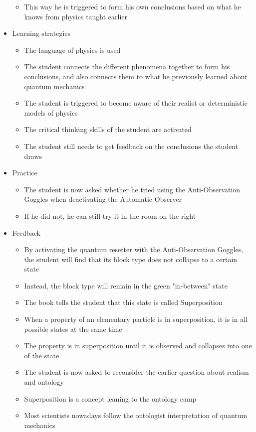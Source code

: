 \documentclass[11pt,twoside]{report} %
\begin{document}
\begin{itemize}
\begin{itemize}
		\item This way he is triggered to form his own conclusions based on what he knows from physics taught earlier
	\end{itemize}
	\item Learning strategies
	\begin{itemize}
		\item The language of physics is used
		\item The student connects the different phenomena together to form his conclusions, and also connects them to what he previously learned about quantum mechanics
		\item The student is triggered to become aware of their realist or deterministic models of physics
		\item The critical thinking skills of the student are activated
		\item The student still needs to get feedback on the conclusions the student draws
	\end{itemize}
	\item Practice
	\begin{itemize}
		\item The student is now asked whether he tried using the Anti-Observation Goggles when deactivating the Automatic Observer
		\item If he did not, he can still try it in the room on the right
	\end{itemize}
	\item Feedback
	\begin{itemize}
		\item By activating the quantum resetter with the Anti-Observation Goggles, the student will find that its block type does not collapse to a certain state
		\item Instead, the block type will remain in the green "in-between" state
		\item The book tells the student that this state is called Superposition
		\item When a property of an elementary particle is in superposition, it is in all possible states at the same time
		\item The property is in superposition until it is observed and collapses into one of the state
		\item The student is now asked to reconsider the earlier question about realism and ontology
		\item Superposition is a concept leaning to the ontology camp
		\item Most scientists nowadays follow the ontologist interpretation of quantum mechanics
	\end{itemize}
\end{itemize}
\end{document}
